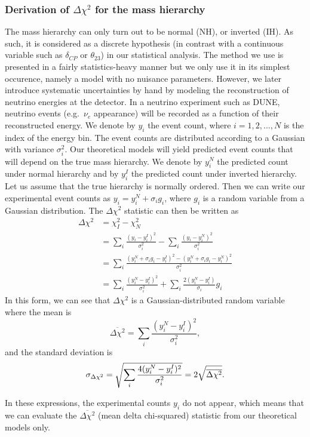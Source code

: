 \documentclass[10pt, a4paper]{article}
\begin{document}
\subsubsection{Derivation of $\Delta \chi^2$ for the mass hierarchy}
The mass hierarchy can only turn out to be normal (NH), or inverted (IH). As
such, it is considered as a discrete hypothesis (in contrast with a continuous
variable such as $\delta_{CP}$ or $\theta_{23}$) in our statistical analysis.
The method we use\cite{ciuffoli, qian} is presented in a fairly
statistics-heavy manner but we only use it in its simplest occurence,
namely a model with no nuisance parameters. However, we later introduce
systematic uncertainties by hand by modeling the reconstruction of neutrino
energies at the detector.
In a neutrino experiment such as DUNE, neutrino events (e.g.~$\nu_e$
appearance) will be recorded as a
function of their reconstructed energy. We denote by $y_i$ the event count,
where $i = 1, 2, ..., N$ is the index of the energy bin. The event counts are
distributed according to a Gaussian with variance $\sigma_i^2$. Our theoretical models
will yield predicted event counts that will depend on the true mass hierarchy.
We denote by $y^N_i$ the predicted count under normal hierarchy and by $y^I_i$
the predicted count under inverted hierarchy.
Let us assume that the true hierarchy is normally ordered. Then we can write
our experimental event counts as $y_i = y^N_i + \sigma_i g_i$, where $g_i$ is a
random variable from a Gaussian distribution.
The $\Delta \chi^2$ statistic can then be written as
\begin{align*}
	\Delta \chi^2 &= \chi_I^2 - \chi_N^2\\
	&= \sum_i \frac{(y_i - y^I_i)^2}{\sigma_i^2} - \sum_i \frac{(y_i -
	y^N_i)^2}{\sigma_i^2}\\
	&= \sum_i \frac{(y^N_i + \sigma_i g_i - y^I_i)^2 - (y^N_i + \sigma_i g_i -
	y^N_i)^2}{\sigma_i^2}\\
	&= \sum_i \frac{(y^N_i - y^I_i)^2}{\sigma_i^2} + \sum_i \frac{2(y^N_i -
	y^I_i)}{\sigma_i} g_i
\end{align*}
In this form, we can see that $\Delta \chi^2$ is a Gaussian-distributed random
variable where the mean is
$$\overline{\Delta\chi^2} = \sum_i \frac{(y^N_i - y^I_i)^2}{\sigma_i^2},$$
and the standard deviation is
$$\sigma_{\Delta\chi^2} = \sqrt{\sum_i \frac{4(y^N_i - y^I_i)^2}{\sigma_i^2}}\\
= 2\sqrt{\overline{\Delta\chi^2}}.$$

In these expressions, the experimental counts $y_i$ do not appear, which means
that we can evaluate the $\overline{\Delta\chi^2}$ (mean delta chi-squared)
statistic from our theoretical models only.
\end{document}
